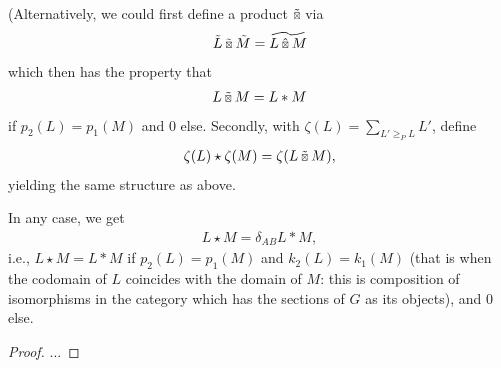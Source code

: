 \documentclass[12pt,a4paper]{amsart}
\newcommand{\kstarhat}{\mathbin{\hat{\scalebox{0.61}{$\boxtimes$}}}}
\newcommand{\kstartilde}{\mathbin{\tilde{\scalebox{0.61}{$\boxtimes$}}}}
\begin{document}
(Alternatively, we could first define a product $\kstartilde$ via
\begin{align*}
  \tilde{L} \kstartilde \tilde{M} = \widetilde{L \kstarhat M}
\end{align*}
which then has the property that
\begin{align*}
  L \kstartilde M = L * M
\end{align*}
if $p_2(L) = p_1(M)$ and $0$ else. Secondly, with $\zeta(L) = \sum_{L' \geq_P L} L'$, define
\begin{align*}
  \zeta(L) \star \zeta(M) = \zeta(L \kstartilde M),
\end{align*}
yielding the same structure as above.

In any case, we get
\begin{align*}
  L \star M = \delta_{AB} L * M,
\end{align*}
i.e., $L \star M = L * M$ if $p_2(L) = p_1(M)$ and $k_2(L) = k_1(M)$
(that is when the codomain of $L$ coincides with the domain of $M$:
this is composition of isomorphisms in the category which has the
sections of $G$ as its objects),
and $0$ else.

\begin{proof}
  ...
\end{proof}
\end{document}
